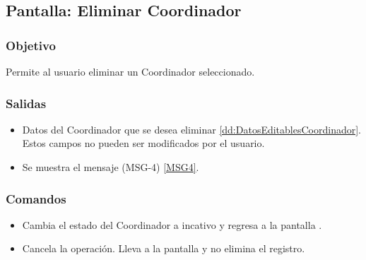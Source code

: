 \subsection{Pantalla: Eliminar Coordinador}

\subsubsection{Objetivo}
Permite al usuario eliminar un Coordinador seleccionado.


\subsubsection{Salidas}

\begin{itemize}
 \item Datos del Coordinador que se desea eliminar \ref{dd:DatosEditablesCoordinador}. Estos campos no pueden ser modificados por el usuario.
 \item Se muestra el mensaje (MSG-4) \ref{MSG4}.
\end{itemize}


\subsubsection{Comandos}
\begin{itemize}
 \item {} Cambia el estado del Coordinador a incativo y regresa a la pantalla .
 \item {} Cancela la operación. Lleva a la pantalla  y no elimina el registro.
\end{itemize}

